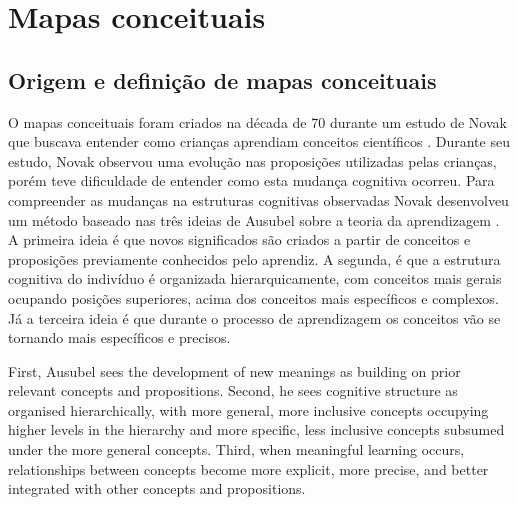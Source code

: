 \documentclass[
	12pt,				%
	openright,			%
	oneside,			%
	a4paper,			%
	english,			%
	french,				%
	spanish,			%
	brazil				%
	]{abntex2}
\begin{document}
\chapter{Mapas conceituais}
\section{Origem e definição de mapas conceituais}
O mapas conceituais foram criados na década de 70 durante um estudo de Novak que buscava entender como crianças aprendiam conceitos científicos \cite{Novak2005}. Durante seu estudo, Novak observou uma evolução nas proposições utilizadas pelas crianças, porém teve dificuldade de entender como esta mudança cognitiva ocorreu. Para compreender as mudanças na estruturas cognitivas observadas Novak desenvolveu um método baseado nas três ideias de Ausubel sobre a teoria da aprendizagem \cite{ausubel1963}. A primeira ideia é que novos significados são criados a partir de conceitos e proposições previamente conhecidos pelo aprendiz. A segunda, é que a estrutura cognitiva do indivíduo é organizada hierarquicamente, com conceitos mais gerais ocupando posições superiores, acima dos conceitos mais específicos e complexos. Já a terceira ideia é que durante o processo de aprendizagem os conceitos vão se tornando mais específicos e precisos.

\begin{citacao}[english]
	First, Ausubel sees the development
	of new meanings as building on prior relevant concepts and propositions. Second,
	he sees cognitive structure as organised hierarchically, with more general, more inclusive concepts occupying higher levels in the hierarchy and more specific, less
	inclusive concepts subsumed under the more general concepts. Third, when meaningful learning occurs, relationships between concepts become more explicit, more
	precise, and better integrated with other concepts and propositions\cite{Novak2005}.
\end{citacao}
\end{document}
